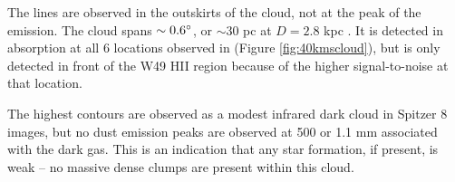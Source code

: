 The \formaldehyde lines are observed in the outskirts of the cloud, not at
the peak of the \thirteenco emission.  The cloud spans $\sim0.6^{\circ}$, or
$\sim30$ pc at $D=2.8$ kpc \citep{Roman-Duval2009a}.  It is detected in \oneone
absorption at all 6 locations observed in \formaldehyde (Figure
\ref{fig:40kmscloud}), but \twotwo is only detected in front of the W49 HII
region because of the higher signal-to-noise at that location.  

The highest \thirteenco contours are observed as a modest infrared dark cloud
in Spitzer 8 \um images, but no dust emission peaks are observed at 500 \um or
1.1 mm associated with the dark gas.  This is an indication that any star
formation, if present, is weak -- no massive dense clumps are present within
this cloud.


